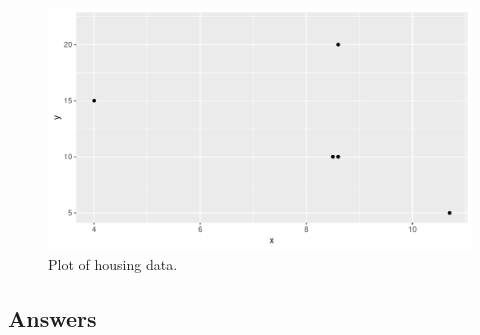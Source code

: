 \documentclass[]{report}\usepackage[]{graphicx}\usepackage[]{color}
\makeatletter
\def\maxwidth{ %
  \ifdim\Gin@nat@width>\linewidth
    \linewidth
  \else
    \Gin@nat@width
  \fi
}
\newenvironment{knitrout}{}{} %
\makeatother
\begin{document}
\begin{enumerate}
\begin{knitrout}
\begin{figure}
{\centering \includegraphics[width=\maxwidth]{figure/lm_16-1} 

}

\caption[Plot of housing data]{Plot of housing data.}\label{fig:lm_16}
\end{figure}


\end{knitrout}


\end{enumerate}

\subsection{Answers}
\end{document}
